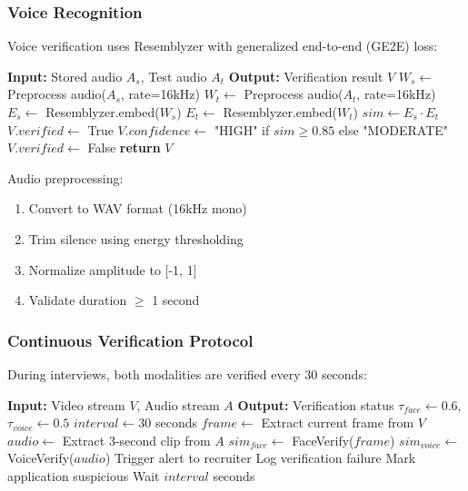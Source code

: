 \documentclass[conference]{IEEEtran}
\begin{document}
\subsubsection{Voice Recognition}

Voice verification uses Resemblyzer with generalized end-to-end (GE2E) loss:

\begin{algorithm}[h]
\caption{Voice Verification}
\label{alg:voice_verify}
\begin{algorithmic}[1]
\STATE \textbf{Input:} Stored audio $A_s$, Test audio $A_t$
\STATE \textbf{Output:} Verification result $V$
\STATE
\STATE $W_s \leftarrow$ Preprocess audio($A_s$, rate=16kHz)
\STATE $W_t \leftarrow$ Preprocess audio($A_t$, rate=16kHz)
\STATE $E_s \leftarrow$ Resemblyzer.embed($W_s$) 
\STATE $E_t \leftarrow$ Resemblyzer.embed($W_t$) 
\STATE $sim \leftarrow E_s \cdot E_t$ 
    \STATE $V.verified \leftarrow$ True
    \STATE $V.confidence \leftarrow$ "HIGH" if $sim \geq 0.85$ else "MODERATE"
\ELSE
    \STATE $V.verified \leftarrow$ False
\ENDIF
\STATE \textbf{return} $V$
\end{algorithmic}
\end{algorithm}

Audio preprocessing:
\begin{enumerate}
    \item Convert to WAV format (16kHz mono)
    \item Trim silence using energy thresholding
    \item Normalize amplitude to [-1, 1]
    \item Validate duration $\geq$ 1 second
\end{enumerate}

\subsubsection{Continuous Verification Protocol}

During interviews, both modalities are verified every 30 seconds:

\begin{algorithm}[h]
\caption{Continuous Interview Monitoring}
\label{alg:continuous_verify}
\begin{algorithmic}[1]
\STATE \textbf{Input:} Video stream $V$, Audio stream $A$
\STATE \textbf{Output:} Verification status
\STATE
\STATE $\tau_{face} \leftarrow 0.6$, $\tau_{voice} \leftarrow 0.5$
\STATE $interval \leftarrow 30$ seconds
    \STATE $frame \leftarrow$ Extract current frame from $V$
    \STATE $audio \leftarrow$ Extract 3-second clip from $A$
    \STATE $sim_{face} \leftarrow$ FaceVerify($frame$)
    \STATE $sim_{voice} \leftarrow$ VoiceVerify($audio$)
        \STATE Trigger alert to recruiter
        \STATE Log verification failure
        \STATE Mark application suspicious
    \ENDIF
    \STATE Wait $interval$ seconds
\ENDWHILE
\end{algorithmic}
\end{algorithm}
\end{document}
